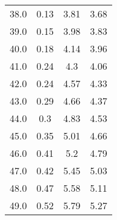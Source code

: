 \begin{table}
\begin{tabular}{cccc}
38.0 & 0.13 & 3.81 & 3.68 \\
39.0 & 0.15 & 3.98 & 3.83 \\
40.0 & 0.18 & 4.14 & 3.96 \\
41.0 & 0.24 & 4.3 & 4.06 \\
42.0 & 0.24 & 4.57 & 4.33 \\
43.0 & 0.29 & 4.66 & 4.37 \\
44.0 & 0.3 & 4.83 & 4.53 \\
45.0 & 0.35 & 5.01 & 4.66 \\
46.0 & 0.41 & 5.2 & 4.79 \\
47.0 & 0.42 & 5.45 & 5.03 \\
48.0 & 0.47 & 5.58 & 5.11 \\
49.0 & 0.52 & 5.79 & 5.27 \\
\end{tabular}
\end{table}
